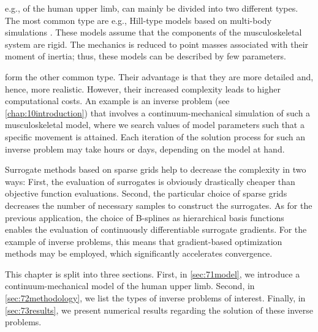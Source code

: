 
\label{chap:70muscle}

e.g., of the human upper limb, can mainly be divided into two different types.
The most common type are 
e.g., Hill-type models based on multi-body simulations
.
These models assume that the components of the musculoskeletal system
are rigid.
The mechanics is reduced to point masses
associated with their moment of inertia;
thus, these models can be described by few parameters.

 form the other common type.
Their advantage is that they are more detailed and, hence, more realistic.
However, their increased complexity leads to higher computational costs.
An example is an inverse problem (see \cref{chap:10introduction})
that involves a continuum-mechanical simulation of such a
musculoskeletal model,
where we search values of model parameters
such that a specific movement is attained.
Each iteration of the solution process for such an inverse problem
may take hours or days, depending on the model at hand.

Surrogate methods based on sparse grids help to decrease the complexity
in two ways:
First, the evaluation of surrogates is obviously drastically cheaper
than objective function evaluations.
Second, the particular choice of sparse grids decreases the number
of necessary samples to construct the surrogates.
As for the previous application,
the choice of B-splines as hierarchical basis functions enables
the evaluation of continuously differentiable surrogate gradients.
For the example of inverse problems, this means that
gradient-based optimization methods may be employed,
which significantly accelerates convergence.

This chapter is split into three sections.
First, in \cref{sec:71model}, we introduce a continuum-mechanical
model of the human upper limb.
Second, in \cref{sec:72methodology}, we list the types of inverse problems
of interest.
Finally, in \cref{sec:73results}, we present numerical results
regarding the solution of these inverse problems.

